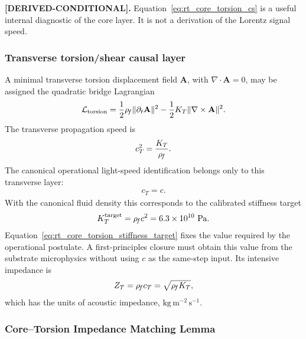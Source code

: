 \textbf{[DERIVED-CONDITIONAL].}
Equation~\eqref{eq:rt_core_torsion_cs} is a useful internal diagnostic of the core layer. It is not a derivation of the Lorentz signal speed.

\subsubsection{Transverse torsion/shear causal layer}

A minimal transverse torsion displacement field \(\mathbf A\), with \(\nabla\cdot\mathbf A=0\), may be assigned the quadratic bridge Lagrangian
\begin{align}
    \mathcal L_{\rm torsion}
    =
    \frac12\rho_{\!f}\lVert\partial_t\mathbf A\rVert^2
    -
    \frac12K_T\lVert\nabla\times\mathbf A\rVert^2 .
\end{align}
The transverse propagation speed is
\begin{align}
    c_T^2=\frac{K_T}{\rho_{\!f}}.
\end{align}
The canonical operational light-speed identification belongs only to this
transverse layer:
\begin{align}
    c_T=c.
    \label{eq:rt_core_torsion_operational_c}
\end{align}
With the canonical fluid density this corresponds to the calibrated stiffness
target
\begin{align}
    K_T^{\mathrm{target}}
    =
    \rho_{\!f} c^2
    =
    6.3\times10^{10}\ \mathrm{Pa}.
    \label{eq:rt_core_torsion_stiffness_target}
\end{align}
Equation~\eqref{eq:rt_core_torsion_stiffness_target} fixes the value required by
the operational postulate. A first-principles closure must obtain this value from
the substrate microphysics without using \(c\) as the same-step input.
Its intensive impedance is
\begin{align}
    Z_T=\rho_{\!f} c_T=\sqrt{\rho_{\!f} K_T},
\end{align}
which has the units of acoustic impedance, \(\mathrm{kg\,m^{-2}\,s^{-1}}\).

\subsubsection{Core--Torsion Impedance Matching Lemma}

